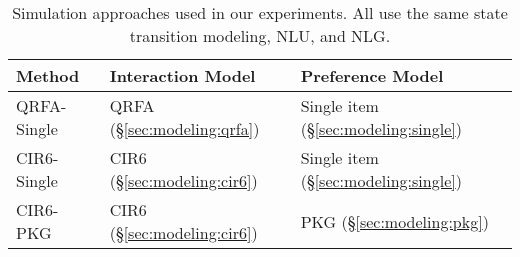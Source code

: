 \begin{table}[t]
	\caption{Simulation approaches used in our experiments. All use the same state transition modeling, NLU, and NLG.}
	\captionshrink
	\begin{tabular}{lll}
	\toprule
	 \textbf{Method} & \textbf{Interaction Model} & \textbf{Preference Model} \\
	\midrule
    QRFA-Single & QRFA (\S\ref{sec:modeling:qrfa}) & Single item  (\S\ref{sec:modeling:single}) \\
    CIR6-Single & CIR6 (\S\ref{sec:modeling:cir6}) & Single item  (\S\ref{sec:modeling:single}) \\
    CIR6-PKG & CIR6 (\S\ref{sec:modeling:cir6}) & PKG (\S\ref{sec:modeling:pkg}) \\
	\bottomrule
	\end{tabular}
	\shrink
\label{tbl:method}
\end{table}